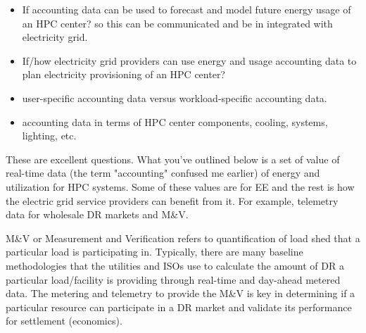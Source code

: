 \begin{itemize}
\item If accounting data can be used to forecast and model future energy usage of an HPC center? so this can be communicated and be in
integrated with electricity grid.
\item If/how electricity grid providers can use energy and usage accounting data to plan electricity provisioning of an HPC center?
\item user-specific accounting data versus workload-specific accounting data.
\item accounting data in terms of HPC center components, cooling, systems, lighting, etc.
\end{itemize}
These are excellent questions. What you've outlined below is a set of value
of real-time data (the term "accounting" confused me earlier) of energy and
utilization for HPC systems. Some of these values are for EE and the rest is
how the electric grid service providers can benefit from it. For example,
telemetry data for wholesale DR markets and M{\&}V.

M{\&}V or Measurement and Verification refers to quantification of load shed
that a particular load is participating in. Typically, there are many
baseline methodologies that the utilities and ISOs use to calculate the
amount of DR a particular load/facility is providing through real-time and
day-ahead metered data. The metering and telemetry to provide the M{\&}V is
key in determining if a particular resource can participate in a DR market 
and validate its performance for settlement (economics).

